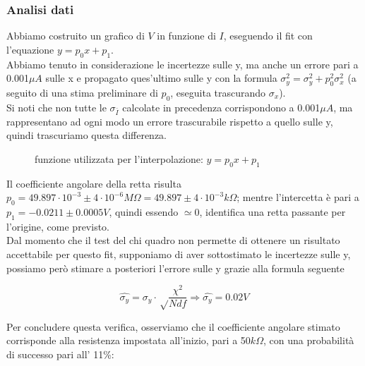 \documentclass[a4paper]{article}
\theoremstyle{definition}
\begin{document}
\subsubsection*{Analisi dati}

Abbiamo costruito un grafico di $V$ in funzione di $I$, eseguendo il fit con l'equazione $y=p_{0}x + p_{1}$.\\
Abbiamo tenuto in considerazione le incertezze sulle y, ma anche un errore pari a 0.001$\mu A$ sulle x e propagato ques'ultimo sulle y con la formula \(\sigma^{2}_{y} = \sigma^{2}_{y} + p^{2}_{0}\sigma^{2}_{x}\) (a seguito di una stima preliminare di \(p_{0}\), eseguita trascurando \(\sigma_{x}\)).\\

\noindent Si noti che non tutte le $\sigma_{\bar{I}}$ calcolate in precedenza corrispondono a 0.001\(\mu A\), ma rappresentano ad ogni modo un errore trascurabile rispetto a quello sulle y, quindi trascuriamo questa differenza.

\pagebreak

\begin{figure}[!ht]

	\caption{funzione utilizzata per l'interpolazione: \(y = p_{0}x + p_{1}\)}
	\label{fig:leggeOhm}
\end{figure}

\noindent Il coefficiente angolare della retta risulta \(p_{0} = 49.897 \cdot 10^{-3} \pm 4 \cdot 10^{-6} M\Omega = 49.897 \pm 4 \cdot 10^{-3} k\Omega\); mentre l'intercetta è pari a \(p_{1} = -0.0211 \pm  0.0005 V\),
quindi essendo $\simeq 0$, identifica una retta passante per l'origine, come previsto.\\

\noindent Dal momento che il test del chi quadro non permette di ottenere un risultato accettabile per questo fit, supponiamo di aver sottostimato le incertezze sulle y, possiamo però stimare a posteriori l'errore sulle y grazie alla formula seguente

\[\hat{\sigma_y} = \sigma_y \cdot  \sqrt\frac{\chi^2}{Ndf} \Rightarrow \hat{\sigma_y} = 0.02V\]

\noindent Per concludere questa verifica, osserviamo che il coefficiente angolare stimato corrisponde alla resistenza impostata all'inizio, pari a 50\(k\Omega\), con una probabilità di successo pari all' 11\%:
\end{document}
